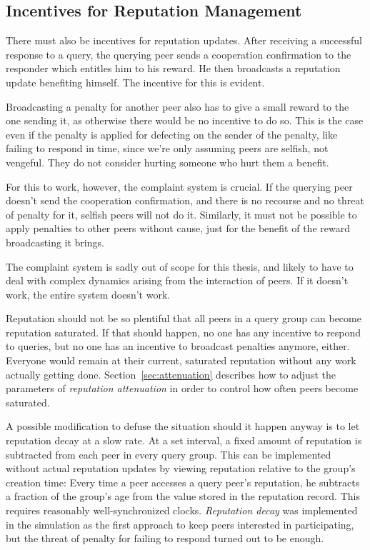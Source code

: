 \subsection{Incentives for Reputation Management}
\label{sec:desc_incentives_rep_mgmt}
There must also be incentives for reputation updates. After receiving a
successful response to a query, the querying peer sends a cooperation
confirmation to the responder which entitles him to his reward. He then
broadcasts a reputation update benefiting himself. The incentive for this is
evident.

Broadcasting a penalty for another peer also has to give a small reward to the
one sending it, as otherwise there would be no incentive to do so. This is the
case even if the penalty is applied for defecting on the sender of the penalty,
like failing to respond in time, since we're only assuming peers are selfish,
not vengeful. They do not consider hurting someone who hurt them a benefit.

For this to work, however, the complaint system is crucial. If the querying peer
doesn't send the cooperation confirmation, and there is no recourse and no
threat of penalty for it, selfish peers will not do it. Similarly, it must not
be possible to apply penalties to other peers without cause, just for the
benefit of the reward broadcasting it brings.

The complaint system is sadly out of scope for this thesis, and likely to have
to deal with complex dynamics arising from the interaction of peers. If it
doesn't work, the entire system doesn't work.

Reputation should not be so plentiful that all peers in a query group can become
reputation saturated. If that should happen, no one has any incentive to respond
to queries, but no one has an incentive to broadcast penalties anymore, either.
Everyone would remain at their current, saturated reputation without any work
actually getting done. Section~\ref{sec:attenuation} describes how to adjust the
parameters of \emph{reputation attenuation} in order to control how often peers
become saturated.

A possible modification to defuse the situation should it happen anyway is to
let reputation decay at a slow rate. At a set interval, a fixed amount of
reputation is subtracted from each peer in every query group. This can be
implemented without actual reputation updates by viewing reputation relative to
the group's creation time: Every time a peer accesses a query peer's reputation,
he subtracts a fraction of the group's age from the value stored in the
reputation record. This requires reasonably well-synchronized clocks.
\emph{Reputation decay} was implemented in the simulation as the first approach
to keep peers interested in participating, but the threat of penalty for failing
to respond turned out to be enough.

